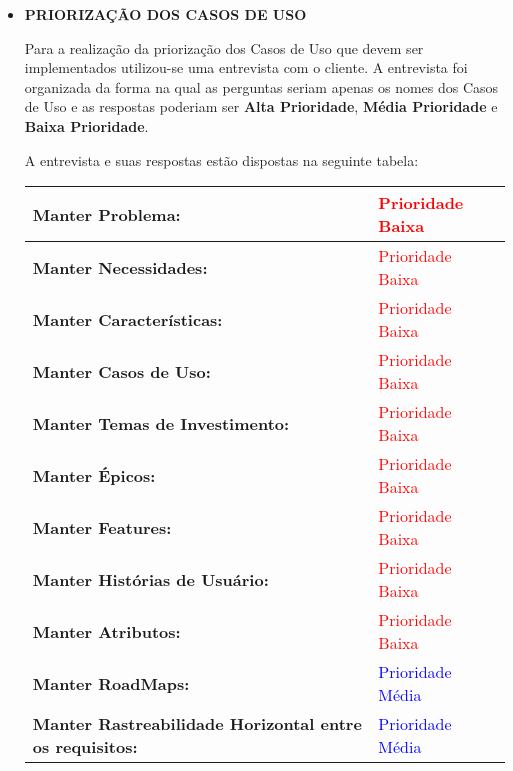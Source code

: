 \begin{itemize}\item \textbf{PRIORIZAÇÃO DOS CASOS DE USO}

Para a realização da priorização dos Casos de Uso que devem ser implementados utilizou-se uma entrevista com o cliente. A entrevista foi organizada da forma na qual as perguntas seriam apenas os nomes dos Casos de Uso e as respostas poderiam ser \textbf{Alta Prioridade}, \textbf{Média Prioridade} e \textbf{Baixa Prioridade}.

A entrevista e suas respostas estão dispostas na seguinte tabela:

\begin{table}[H]
\centering
\begin{tabular}{|p{7cm}|p{3cm}|}
\hline
\textbf{Manter Problema:} &
\textcolor{red}{Prioridade Baixa}
\\ \hline
\textbf{Manter Necessidades:} &
\textcolor{red}{Prioridade Baixa}
\\ \hline
\textbf{Manter Características:} &
\textcolor{red}{Prioridade Baixa}
\\ \hline
\textbf{Manter Casos de Uso:} &
\textcolor{red}{Prioridade Baixa}
\\ \hline
\textbf{Manter Temas de Investimento:} &
\textcolor{red}{Prioridade Baixa}
\\ \hline
\textbf{Manter Épicos:} &
\textcolor{red}{Prioridade Baixa}
\\ \hline
\textbf{Manter Features:} &
\textcolor{red}{Prioridade Baixa}
\\ \hline
\textbf{Manter Histórias de Usuário:} &
\textcolor{red}{Prioridade Baixa}
\\ \hline
\textbf{Manter Atributos:} &
\textcolor{red}{Prioridade Baixa}
\\ \hline
\textbf{Manter RoadMaps:} &
\textcolor{blue}{Prioridade Média}
\\ \hline
\textbf{Manter Rastreabilidade Horizontal entre os requisitos:} &
\textcolor{blue}{Prioridade Média}
\\ \hline

\end{tabular}
\end{table}
\end{itemize}
